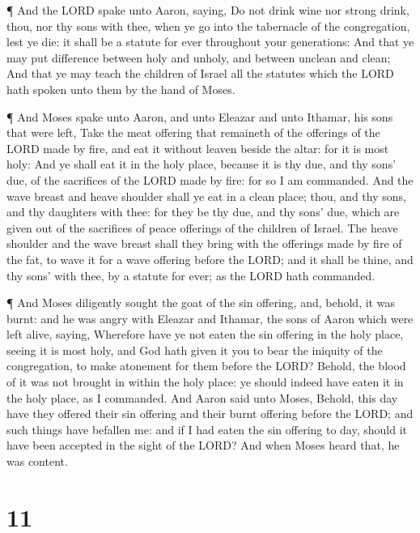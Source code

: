  ¶ And the LORD spake unto Aaron, saying,  Do
not drink wine nor strong drink, thou, nor thy sons with thee, when ye
go into the tabernacle of the congregation, lest ye die: it shall be a
statute for ever throughout your generations:  And that ye
may put difference between holy and unholy, and between unclean and
clean;  And that ye may teach the children of Israel all
the statutes which the LORD hath spoken unto them by the hand of Moses.

 ¶ And Moses spake unto Aaron, and unto Eleazar and unto
Ithamar, his sons that were left, Take the meat offering that remaineth
of the offerings of the LORD made by fire, and eat it without leaven
beside the altar: for it is most holy:  And ye shall eat it
in the holy place, because it is thy due, and thy sons' due, of the
sacrifices of the LORD made by fire: for so I am commanded.
 And the wave breast and heave shoulder shall ye eat in a
clean place; thou, and thy sons, and thy daughters with thee: for they
be thy due, and thy sons' due, which are given out of the sacrifices of
peace offerings of the children of Israel.  The heave
shoulder and the wave breast shall they bring with the offerings made by
fire of the fat, to wave it for a wave offering before the LORD; and it
shall be thine, and thy sons' with thee, by a statute for ever; as the
LORD hath commanded.

 ¶ And Moses diligently sought the goat of the sin
offering, and, behold, it was burnt: and he was angry with Eleazar and
Ithamar, the sons of Aaron which were left alive, saying, 
Wherefore have ye not eaten the sin offering in the holy place, seeing
it is most holy, and God hath given it you to bear the iniquity of the
congregation, to make atonement for them before the LORD? 
Behold, the blood of it was not brought in within the holy place: ye
should indeed have eaten it in the holy place, as I commanded.
 And Aaron said unto Moses, Behold, this day have they
offered their sin offering and their burnt offering before the LORD; and
such things have befallen me: and if I had eaten the sin offering to
day, should it have been accepted in the sight of the LORD?
 And when Moses heard that, he was content.

\hypertarget{section-10}{%
\section{11}\label{section-10}}

